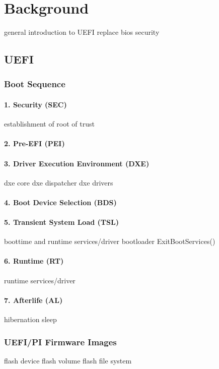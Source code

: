 %
\chapter{Background}

general introduction to UEFI
replace bios
security

\section{UEFI}
\subsection{Boot Sequence}

\subsubsection{1. Security (SEC)}
establishment of root of trust
\subsubsection{2. Pre-EFI (PEI)}
\subsubsection{3. Driver Execution Environment (DXE)}
dxe core
dxe dispatcher
dxe drivers
\subsubsection{4. Boot Device Selection (BDS)}
\subsubsection{5. Transient System Load (TSL)}
boottime and runtime services/driver
bootloader
ExitBootServices()
\subsubsection{6. Runtime (RT)}
runtime services/driver
\subsubsection{7. Afterlife (AL)}
hibernation
sleep


\subsection{UEFI/PI Firmware Images}
flash device
flash volume
flash file system

